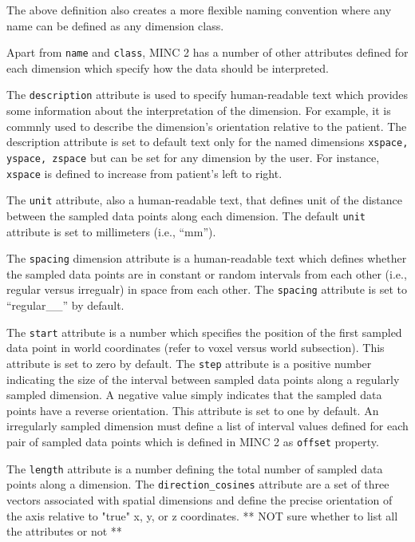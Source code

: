\documentclass{article}
\begin{document}
The above definition also creates a more flexible naming convention where any name 
can be defined as any dimension class.

Apart from {\tt name} and {\tt class}, MINC 2 has a number of other attributes defined for 
each dimension which specify how the data should be interpreted. 

The {\tt description} attribute is used to specify human-readable text which provides
some information about the interpretation of the dimension. For example, it is commnly 
used to describe the dimension's orientation relative to the patient.
The description attribute is set to default text only for the named dimensions
{\tt xspace, yspace, zspace} but can be set for any dimension by the user. For instance,
{\tt xspace} is defined to increase from patient's left to right.

The {\tt unit} attribute, also a human-readable text, that defines unit of the distance
between the sampled data points along each dimension. The default {\tt unit} attribute is set
to millimeters (i.e., ``mm'').

The {\tt spacing} dimension attribute is a human-readable text which defines whether
the sampled data points are in constant or random intervals from each other
(i.e., regular versus irregualr) in space from each other. The {\tt spacing} attribute
is set to ``regular\_\_'' by default.

The {\tt start} attribute is a number which specifies the position of the first 
sampled data point in world coordinates (refer to voxel versus world subsection).
This attribute is set to zero by default.
The {\tt step} attribute is a positive number indicating the size of the interval
between sampled data points along a regularly sampled dimension. A negative value simply
indicates that the sampled data points have a reverse orientation. This attribute is
set to one by default. 
An irregularly sampled dimension must define a list of interval values defined for each
pair of sampled data points which is defined in MINC 2 as {\tt offset} property. 

The {\tt length} attribute is a number defining the total number of sampled data 
points along a dimension.
The {\tt direction\_cosines} attribute are a set of three vectors associated with 
spatial dimensions and define the precise orientation of the axis relative to "true" 
x, y, or z coordinates.
** NOT sure whether to list all the attributes or not **
\end{document}
